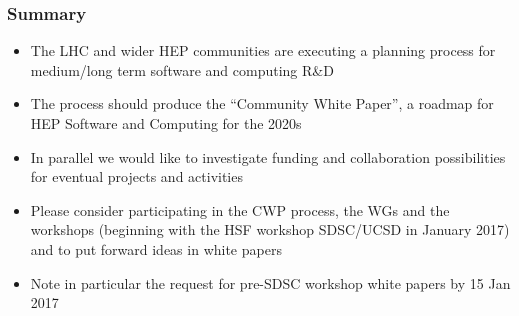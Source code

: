 \begin{frame}
\frametitle{Summary}

\begin{itemize}
\item The LHC and wider HEP communities are executing a planning process for medium/long term software and computing R\&D
\item The process should produce the ``Community White Paper'', a roadmap for HEP Software and Computing for the 2020s
\item In parallel we would like to investigate funding and collaboration possibilities for eventual projects and activities
\item Please consider participating in the CWP process, the WGs and the workshops (beginning with the HSF workshop SDSC/UCSD in January 2017) and to put forward ideas in white papers
\item Note in particular the request for pre-SDSC workshop white papers by 15 Jan 2017
\end{itemize}

\end{frame}


